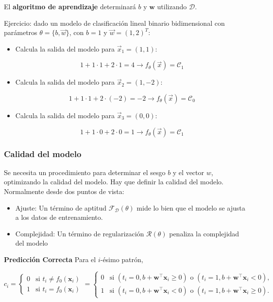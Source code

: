 El \textbf{algoritmo de aprendizaje} determinará $b$ y $\mathbf{w}$ utilizando $\mathcal{D}$.

Ejercicio: dado un modelo de clasificación lineal binario bidimensional con parámetros $\theta = \{b, \vec{w}\}$, con $b = 1$ y $\vec{w} = (1, 2)^T$:
\begin{itemize}
\item Calcula la salida del modelo para $\vec{x}_1 = (1,1)$:

$$1 + 1 \cdot 1 + 2 \cdot 1 = 4 \rightarrow f_{\theta}(\vec{x}) = \mathcal{C}_1$$

\item Calcula la salida del modelo para $\vec{x}_2 = (1,-2)$:

$$1 + 1 \cdot 1 + 2 \cdot (-2) = -2 \rightarrow f_{\theta}(\vec{x}) = \mathcal{C}_0$$

\item Calcula la salida del modelo para $\vec{x}_3 = (0,0)$:

$$1 + 1 \cdot 0 + 2 \cdot 0 = 1 \rightarrow f_{\theta}(\vec{x}) = \mathcal{C}_1$$
\end{itemize}

\subsubsection{Calidad del modelo}
Se necesita un procedimiento para determinar el sesgo $b$ y el vector $w$, optimizando la calidad del modelo. Hay que definir la calidad del modelo. Normalmente desde dos puntos de vista:
\begin{itemize}
\item Ajuste: Un término de aptitud $\mathcal{F_D}(\theta)$ mide lo bien que el modelo se ajusta a los datos de entrenamiento.
\item Complejidad: Un término de regularización $\mathcal{R}(\theta)$ penaliza la complejidad del modelo
\end{itemize}

\textbf{Predicción Correcta} Para el $i$-ésimo patrón,

\[c_i = 
\begin{cases} 
0 & \text{si } t_i \neq f_0(\mathbf{x}_i) \\ 
1 & \text{si } t_i = f_0(\mathbf{x}_i) 
\end{cases}
= 
\begin{cases} 
0 & \text{si } (t_i = 0, b + \mathbf{w}^\intercal \mathbf{x}_i \geq 0) \text{ o } (t_i = 1, b + \mathbf{w}^\intercal \mathbf{x}_i < 0), \\ 
1 & \text{si } (t_i = 0, b + \mathbf{w}^\intercal \mathbf{x}_i < 0) \text{ o } (t_i = 1, b + \mathbf{w}^\intercal \mathbf{x}_i \geq 0). 
\end{cases}\]

